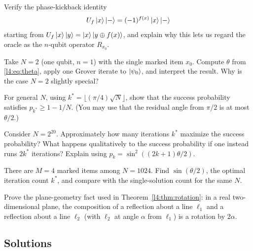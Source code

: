 \begin{exercise}
\label{l4:ex:phaseoracle}
Verify the phase-kickback identity
\[
  U_f\ket{x}\ket{-}=(-1)^{f(x)}\ket{x}\ket{-}
\]
starting from $U_f\ket{x}\ket{y}=\ket{x}\ket{y\oplus f(x)}$, and explain why this
lets us regard the oracle as the $n$-qubit operator $R_{x_0}$.
\end{exercise}

\begin{exercise}
\label{l4:ex:n2}
Take $N=2$ (one qubit, $n=1$) with the single marked item $x_0$. Compute $\theta$
from \eqref{l4:eq:theta}, apply one Grover iterate to $\ket{\psi_0}$, and interpret the
result. Why is the case $N=2$ slightly special?
\end{exercise}

\begin{exercise}
\label{l4:ex:success}
For general $N$, using $k^{\ast}=\lfloor(\pi/4)\sqrt N\rfloor$, show that the
success probability satisfies $p_{k^{\ast}}\ge1-1/N$. (You may use that the
residual angle from $\pi/2$ is at most $\theta/2$.)
\end{exercise}

\begin{exercise}
\label{l4:ex:overrotate}
Consider $N=2^{20}$. Approximately how many iterations $k^{\ast}$ maximize the
success probability? What happens qualitatively to the success probability if one
instead runs $2k^{\ast}$ iterations? Explain using $p_k=\sin^2((2k+1)\theta/2)$.
\end{exercise}

\begin{exercise}
\label{l4:ex:multi}
There are $M=4$ marked items among $N=1024$. Find $\sin(\theta/2)$, the optimal
iteration count $k^{\ast}$, and compare with the single-solution count for the same
$N$.
\end{exercise}

\begin{exercise}
\label{l4:ex:reflprod}
Prove the plane-geometry fact used in Theorem~\ref{l4:thm:rotation}: in a real
two-dimensional plane, the composition of a reflection about a line $\ell_1$ and a
reflection about a line $\ell_2$ (with $\ell_2$ at angle $\alpha$ from $\ell_1$) is
a rotation by $2\alpha$.
\end{exercise}

\subsection*{Solutions}

